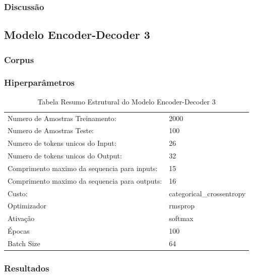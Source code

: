 \subsubsection{Discussão}

\subsection{Modelo Encoder-Decoder 3}

\subsubsection{Corpus}
\subsubsection{Hiperparâmetros} 

\begin{table}[h]
\centering
\begin{tabular}{ll}
Numero de Amostras Treinamento: & 2000 \\
Numero de Amostras Teste: & 100 \\
Numero de tokens unicos do Input: & 26 \\
Numero de tokens unicos do Output: & 32 \\
Comprimento maximo da sequencia para inputs: & 15 \\
Comprimento maximo da sequencia para outputs: & 16 \\
Custo: & categorical\_crossentropy \\
Optimizador & rmsprop \\
Ativação & softmax \\
Épocas & 100 \\
Batch Size & 64
\end{tabular}
\caption{Tabela Resumo Estrutural do Modelo Encoder-Decoder 3}
\label{tab:res3}
\end{table}

\subsubsection{Resultados}

